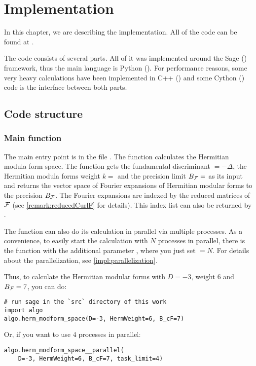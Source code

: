 
\section{Implementation}

In this chapter, we are describing the implementation. All of the code can be found at \cite{Zeyer13Github}.

The code consists of several parts.
All of it was implemented around the Sage (\cite{sage}) framework, thus the main language is Python (\cite{python}).
For performance reasons, some very heavy calculations have been implemented in C++ (\cite{cpp}) and some Cython (\cite{cython}) code is the interface between both parts.

\subsection{Code structure}

\subsubsection{Main function }
The main entry point is in the file .
The function  calculates the Hermitian modula form space.
The function gets the fundamental discriminant  $= - \Delta$, the Hermitian modula forms weight $k =$  and the precision limit $B_{\mathcal{F}} =$  as its input and returns the vector space of Fourier expansions of Hermitian modular forms to the precision $B_{\mathcal{F}}$. The Fourier expansions are indexed by the reduced matrices of $\mathcal{F}$ (see \cref{remark:reducedCurlF} for details). This index list can also be returned by .

The function can also do its calculation in parallel via multiple processes. As a convenience, to easily start the calculation with $N$ processes in parallel, there is the function  with the additional parameter , where you just set  $=N$. For details about the parallelization, see \cref{impl:parallelization}.

Thus, to calculate the Hermitian modular forms with $D=-3$, weight $6$ and $B_{\mathcal{F}} = 7$, you can do:
\begin{lstlisting}
# run sage in the `src` directory of this work
import algo
algo.herm_modform_space(D=-3, HermWeight=6, B_cF=7)
\end{lstlisting}
Or, if you want to use 4 processes in parallel:
\begin{lstlisting}
algo.herm_modform_space__parallel(
    D=-3, HermWeight=6, B_cF=7, task_limit=4)
\end{lstlisting}

